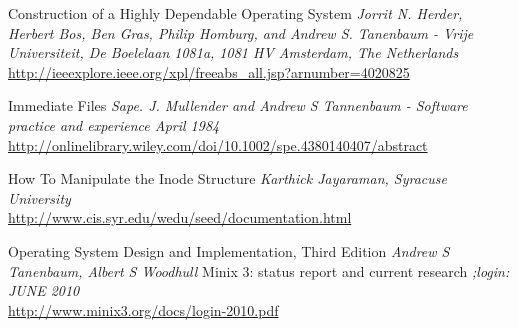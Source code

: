 \cleardoublepage
{}
{}
\begin{thebibliography}{99}

 Construction of a Highly Dependable Operating System { \em Jorrit N. Herder, Herbert Bos, Ben Gras, Philip Homburg, and Andrew S. Tanenbaum - Vrije Universiteit, De Boelelaan 1081a, 1081 HV Amsterdam, The Netherlands } \\ \url{http://ieeexplore.ieee.org/xpl/freeabs_all.jsp?arnumber=4020825}

Immediate Files {\em Sape. J. Mullender and Andrew S Tannenbaum - Software practice and experience April 1984 } \\  \url{http://onlinelibrary.wiley.com/doi/10.1002/spe.4380140407/abstract}

 How To Manipulate the Inode Structure  {\em Karthick Jayaraman, Syracuse University } \\ \url {http://www.cis.syr.edu/wedu/seed/documentation.html}

 Operating System Design and Implementation, Third Edition{ \em Andrew S Tanenbaum, Albert S Woodhull }
 Minix 3: status report and current research { \em ;login: JUNE 2010 } \\ \url{http://www.minix3.org/docs/login-2010.pdf}


\end{thebibliography}
